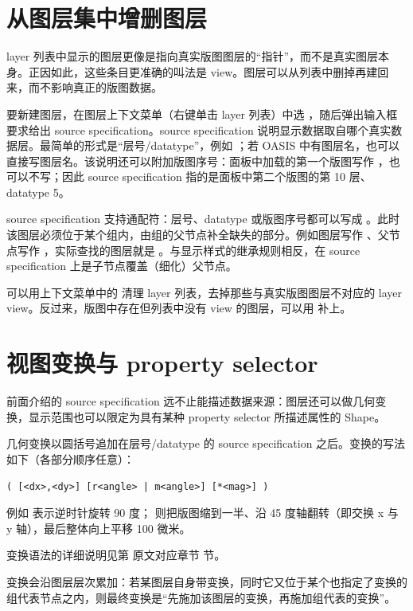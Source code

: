 \section{从图层集中增删图层}\label{sec:layer_source}

layer 列表中显示的图层更像是指向真实版图图层的“指针”，而不是真实图层本身。正因如此，这些条目更准确的叫法是 view。图层可以从列表中删掉再建回来，而不影响真正的版图数据。

要新建图层，在图层上下文菜单（右键单击 layer 列表）中选 ，随后弹出输入框要求给出 source specification。source specification 说明显示数据取自哪个真实数据层。最简单的形式是“层号/datatype”，例如 ；若 OASIS 中有图层名，也可以直接写图层名。该说明还可以附加版图序号：面板中加载的第一个版图写作 ，也可以不写；因此 source specification  指的是面板中第二个版图的第 10 层、datatype 5。

source specification 支持通配符：层号、datatype 或版图序号都可以写成 \ui{*}。此时该图层必须位于某个组内，由组的父节点补全缺失的部分。例如图层写作 、父节点写作 ，实际查找的图层就是 。与显示样式的继承规则相反，在 source specification 上是子节点覆盖（细化）父节点。

可以用上下文菜单中的  清理 layer 列表，去掉那些与真实版图图层不对应的 layer view。反过来，版图中存在但列表中没有 view 的图层，可以用  补上。

\section{视图变换与 property selector}\label{sec:layer_source_expert}

前面介绍的 source specification 远不止能描述数据来源：图层还可以做几何变换，显示范围也可以限定为具有某种 property selector 所描述属性的 Shape。

几何变换以圆括号追加在层号/datatype 的 source specification 之后。变换的写法如下（各部分顺序任意）：

\begin{lstlisting}
( [<dx>,<dy>] [r<angle> | m<angle>] [*<mag>] )
\end{lstlisting}

例如  表示逆时针旋转 90 度； 则把版图缩到一半、沿 45 度轴翻转（即交换 x 与 y 轴），最后整体向上平移 100 微米。

变换语法的详细说明见第 原文对应章节 节。

变换会沿图层层次累加：若某图层自身带变换，同时它又位于某个也指定了变换的组代表节点之内，则最终变换是“先施加该图层的变换，再施加组代表的变换”。

